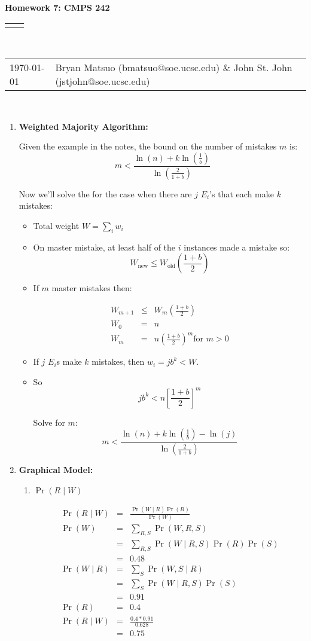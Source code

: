 \documentclass[12pt]{article}
\renewcommand{\title}[1]{\textbf{#1}\\}
\renewcommand{\line}{\begin{tabularx}{\textwidth}{X>{\raggedleft}X}\hline\\\end{tabularx}\\[-0.5cm]}
\newcommand{\leftright}[2]{\begin{tabularx}{\textwidth}{X>{\raggedleft}X}#1%
& #2\\\end{tabularx}\\[-0.5cm]}
\begin{document}
\title{Homework 7: CMPS 242}
\line
\leftright{\today}{Bryan Matsuo (bmatsuo@soe.ucsc.edu) \& John St. John (jstjohn@soe.ucsc.edu)} %


\begin{enumerate}
\item \textbf{Weighted Majority Algorithm:}

Given the example in the notes, the bound on the number of mistakes $m$ is:
\[
m <  \frac{\ln(n) + k\ln\left(\frac{1}{b}\right)}{\ln\left( \frac{2}{1+b}  \right)}
\]

Now we'll solve the for the case when there are $j$ $E_i$'s that each make $k$ mistakes:

\begin{itemize}
\item  Total weight $W = \sum_i w_i$
\item On master mistake, at least half of the $i$ instances made a mistake so: \[W_{\text{new}} \leq W_{\text{old}} \left( \frac{1+b}{2}\right) \]
\item If $m$ master mistakes then: 

\begin{eqnarray*}
W_{m+1} &\leq& W_m \left( \frac{1+b}{2}\right)\\
W_0 &=& n \\
W_m &=& n\left( \frac{1+b}{2}\right)^m \text{for } m > 0 
\end{eqnarray*}

\item If $j$ $E_i$s make $k$ mistakes, then $w_i = jb^k < W$.
\item So \[jb^k < n\left[ \frac{1+b}{2} \right]^m\]

Solve for $m$:
\[
m <  \frac{\ln(n) + k\ln\left(\frac{1}{b}\right) - \ln(j)}{\ln\left( \frac{2}{1+b}  \right)}
\]


\end{itemize}




\item \textbf{Graphical Model:}
\begin{enumerate}
\item $\Pr(R\mid W)$

\begin{eqnarray*}
	\Pr(R\mid W)  &=& \frac{\Pr(W\mid R) \Pr(R)}{\Pr(W)} \\
	\Pr(W) &=& \sum_{R,S} \Pr(W,R,S) \\
	 	&=& \sum_{R,S} \Pr(W\mid R,S) \Pr(R) \Pr(S) \\
		&=&0.48\\
	\Pr(W\mid R) &=& \sum_S \Pr(W,S\mid R) \\
		&=& \sum_S \Pr(W\mid R,S) \Pr(S)\\
		&=& 0.91 \\
	\Pr(R) &=& 0.4 \\
	\Pr(R\mid W)  &=& \frac{0.4 *0.91 }{0.628} \\
		&=& 0.75
\end{eqnarray*}



\end{enumerate}
\end{enumerate}
\end{document}
